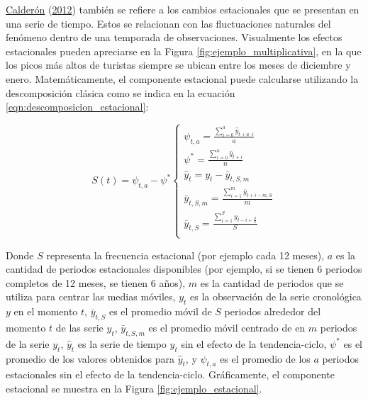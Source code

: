 \documentclass[
]{article}
\begin{document}
\protect\hyperlink{ref-calderon2012estadistica}{Calderón}
(\protect\hyperlink{ref-calderon2012estadistica}{2012}) también se
refiere a los cambios estacionales que se presentan en una serie de
tiempo. Estos se relacionan con las fluctuaciones naturales del fenómeno
dentro de una temporada de observaciones. Visualmente los efectos
estacionales pueden apreciarse en la Figura
\ref{fig:ejemplo_multiplicativa}, en la que los picos más altos de
turistas siempre se ubican entre los meses de diciembre y enero.
Matemáticamente, el componente estacional puede calcularse utilizando la
descomposición clásica como se indica en la ecuación
\eqref{eqn:descomposicion_estacional}:

\begin{equation}
\label{eqn:descomposicion_estacional}
S(t)=\psi_{t,a}-\psi^*
\begin{cases}
\psi_{t,a} = \frac{\sum_{i=0}^a \hat{y}_{t+a\cdot i}}{a} \\
\psi^*=\frac{\sum_{i=0}^n \hat{y}_{t+i}}{n} \\
\hat{y}_t=y_t-\bar{y}_{t,S,m} \\
\bar{y}_{t,S,m}=\frac{\sum_{i=1}^m \bar{y}_{t+i-m,S}}{m} \\
\bar{y}_{t,S}=\frac{\sum_{i=1}^S y_{t-i+\frac{S}{2}}}{S} \\
\end{cases}
\end{equation}

Donde \(S\) representa la frecuencia estacional (por ejemplo cada 12
meses), \(a\) es la cantidad de periodos estacionales disponibles (por
ejemplo, si se tienen 6 periodos completos de 12 meses, se tienen 6
años), \(m\) es la cantidad de periodos que se utiliza para centrar las
medias móviles, \(y_t\) es la observación de la serie cronológica \(y\)
en el momento \(t\), \(\bar{y}_{t,S}\) es el promedio móvil de \(S\)
periodos alrededor del momento \(t\) de las serie \(y_t\),
\(\bar{y}_{t,S,m}\) es el promedio móvil centrado de en \(m\) periodos
de la serie \(y_t\), \(\hat{y}_t\) es la serie de tiempo \(y_t\) sin el
efecto de la tendencia-ciclo, \(\psi^*\) es el promedio de los valores
obtenidos para \(\hat{y}_t\), y \(\psi_{t,a}\) es el promedio de los
\(a\) periodos estacionales sin el efecto de la tendencia-ciclo.
Gráficamente, el componente estacional se muestra en la Figura
\ref{fig:ejemplo_estacional}.
\end{document}
